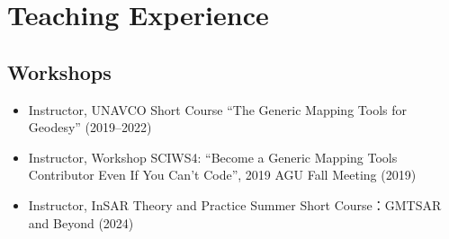 \section{Teaching Experience}

\subsection{Workshops}
\begin{itemize}
\item Instructor, UNAVCO Short Course ``The Generic Mapping Tools for Geodesy'' (2019--2022)
\item Instructor, Workshop SCIWS4: ``Become a Generic Mapping Tools Contributor Even If You Can't Code'', 2019 AGU Fall Meeting (2019)
\item Instructor, InSAR Theory and Practice Summer Short Course：GMTSAR and Beyond (2024)
\end{itemize}
